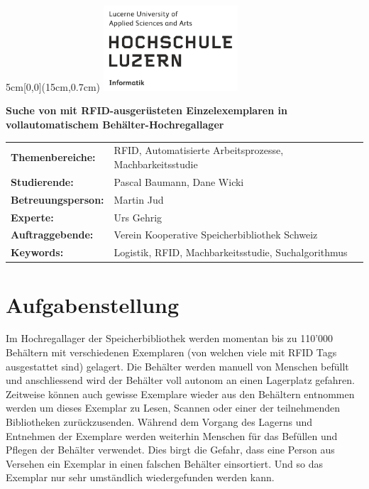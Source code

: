 \documentclass[
	a4paper
]{scrartcl}
\begin{document}

\begin{textblock*}{5cm}[0,0](15cm,0.7cm)
	\includegraphics[keepaspectratio,width=5cm]{img/HSLU_Logo}
\end{textblock*}

\vspace*{2cm}

\noindent
\textbf{\LARGE{Suche von mit RFID-ausgerüsteten Einzelexemplaren in vollautomatischem
Behälter-Hochregallager}} \\

\vspace{0.5em}

\bgroup
\setlength\tabcolsep{0cm}

\begin{large}
\noindent
\begin{tabularx}{\textwidth}{p{5cm}X}
	\textbf{Themenbereiche:} & RFID, Automatisierte Arbeitsprozesse, Machbarkeitsstudie\\
	\textbf{Studierende:} & Pascal Baumann, Dane Wicki\\
	\textbf{Betreuungsperson:} & Martin Jud\\
	\textbf{Experte:} & Urs Gehrig\\
	\textbf{Auftraggebende:} & Verein Kooperative Speicherbibliothek Schweiz\\
	\textbf{Keywords:} & Logistik, RFID, Machbarkeitsstudie, Suchalgorithmus\\
\end{tabularx}
\end{large}
\egroup

\section{Aufgabenstellung}
Im Hochregallager der Speicherbibliothek werden momentan bis zu 110'000 Behältern mit verschiedenen Exemplaren (von welchen viele mit RFID Tags ausgestattet sind) gelagert. Die Behälter werden manuell von Menschen befüllt und anschliessend wird der Behälter voll autonom an einen Lagerplatz gefahren. Zeitweise können auch gewisse Exemplare wieder aus den Behältern entnommen werden um dieses Exemplar zu Lesen, Scannen oder einer der teilnehmenden Bibliotheken zurückzusenden. Während dem Vorgang des Lagerns und Entnehmen der Exemplare werden weiterhin Menschen für das Befüllen und Pflegen der Behälter verwendet. Dies birgt die Gefahr, dass eine Person aus Versehen ein Exemplar in einen falschen Behälter einsortiert. Und so das Exemplar nur sehr umständlich wiedergefunden werden kann.
\end{document}
